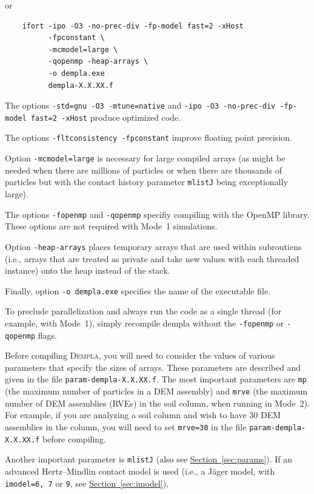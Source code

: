 \documentclass[letterpaper,11pt]{article}
\newcommand{\Dempla}{\textsc{Dempla}}
\begin{document}
\begin{enumerate}
or
\begin{verbatim}
    ifort -ipo -O3 -no-prec-div -fp-model fast=2 -xHost
          -fpconstant \
          -mcmodel=large \
          -qopenmp -heap-arrays \
          -o dempla.exe
          dempla-X.X.XX.f
\end{verbatim}
The options \texttt{-std=gnu -O3 -mtune=native} and
\texttt{-ipo -O3 -no-prec-div -fp-model fast=2 -xHost} produce
optimized code.
\par
The options \texttt{-fltconsistency -fpconstant}
improve floating point precision.
\par
Option \texttt{-mcmodel=large} is necessary
for large compiled arrays (as might be needed
when there are millions of particles or when there are
thousands of particles but with
the contact history parameter \texttt{mlistJ}
being exceptionally large).
\par
The options \texttt{-fopenmp} and \texttt{-qopenmp}
specifiy compiling with the OpenMP library.
These options are not required with Mode~1 simulations.
\par
Option \texttt{-heap-arrays}
places temporary arrays that are used within subroutiens
(i.e., arrays that are treated as private and take new
values with each threaded instance) onto the heap instead
of the stack.
\par
Finally, option \texttt{-o dempla.exe} specifies the
name of the executable file.
\par
To preclude parallelization and always run the code
as a single thread
(for example, with Mode~1), simply
recompile dempla without the \texttt{-fopenmp}
or \texttt{-qopenmp} flags.
\par
Before compiling \Dempla,
you will need to consider the values of various
parameters that specify the sizes of arrays.
These parameters are described and given in the
file \texttt{param-dempla-X.X.XX.f}.
The most important parameters are \texttt{mp}
(the maximum number of particles in a DEM assembly)
and \texttt{mrve} (the maximum number of DEM assemblies
(RVEs) in the soil column, when running in Mode~2).
For example,
if you are analyzing a soil column and wish to have
30 DEM assemblies in the column, you will need to
set \texttt{mrve=30}
in the file \texttt{param-dempla-X.X.XX.f}
before compiling.
\par
Another important parameter is \texttt{mlistJ}
(also see
\hyperref[sec:params]{Section~\ref*{sec:params}}).
If an advanced Hertz--Mindlin contact model is used
(i.e., a J\"{a}ger model, with \texttt{imodel=6, 7} or \texttt{9},
see
\hyperref[sec:imodel]{Section~\ref*{sec:imodel}}),

\end{enumerate}
\end{document}
